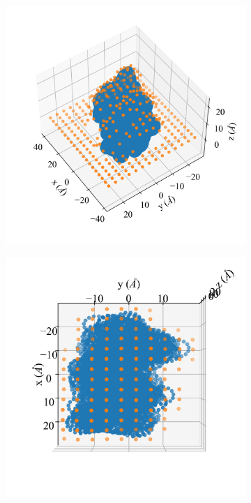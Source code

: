 \begin{figure}[H]
\centering
    \begin{subfigure}[t]{0.47\textwidth}
        \centering
        \caption{}
        \includegraphics[width=1\linewidth]{Figures/AFMSimulationScanPos-1bna1.png} 
    \end{subfigure}
    \hfill
    \begin{subfigure}[t]{0.51\textwidth}
        \centering
        \caption{}
        \includegraphics[width=1\linewidth]{Figures/AFMSimulationScanPos-1bna2.png}
    \end{subfigure} 
    

\end{figure}
